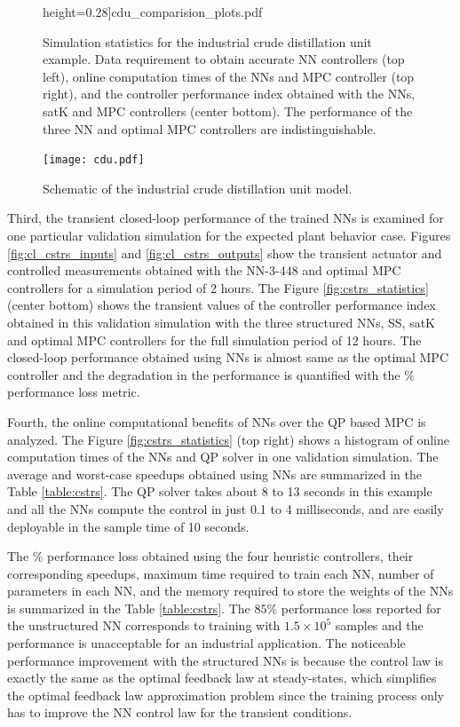 \documentclass[preprint,5p, twocolumn, authoryear]{elsarticle}
\begin{document}
\begin{figure}[!h]
\begin{center}
        height=0.28\textheight]{cdu_comparision_plots.pdf}\end{center}
    \vspace{-0.2in}
    \caption{Simulation statistics for the industrial crude distillation unit
    example. Data requirement to obtain accurate NN controllers (top left),
    online computation times of the NNs and MPC controller (top right), and the
    controller performance index obtained with the NNs, satK and MPC controllers
    (center bottom). The performance of the three NN and optimal MPC
    controllers are indistinguishable.}	
    \label{fig:cdu_statistics}
\end{figure}

\begin{figure}[!h]
    \centering
    \texttt{[image: cdu.pdf]}
    \caption{Schematic of the industrial crude distillation unit model.}
    \label{fig:schematic_cdu}
\end{figure}

Third, the transient closed-loop performance of the trained NNs is examined for
one particular validation simulation for the expected plant behavior case.
Figures \ref{fig:cl_cstrs_inputs} and \ref{fig:cl_cstrs_outputs} show the
transient actuator and controlled measurements obtained with the NN-3-448 and
optimal MPC controllers for a simulation period of 2 hours. The Figure
\ref{fig:cstrs_statistics} (center bottom) shows the transient values of the
controller performance index obtained in this validation simulation with the
three structured NNs, SS, satK and optimal MPC controllers for the full
simulation period of 12 hours. The closed-loop performance obtained using NNs is
almost same as the optimal MPC controller and the degradation in the performance
is quantified with the $\%$ performance loss metric.

Fourth, the online computational benefits of NNs over the QP based MPC is
analyzed. The Figure \ref{fig:cstrs_statistics} (top right) shows a histogram of
online computation times of the NNs and QP solver in one validation simulation.
The average and worst-case speedups obtained using NNs are summarized in the
Table \ref{table:cstrs}. The QP solver takes about 8 to 13 seconds in this
example and all the NNs compute the control in just 0.1 to 4 milliseconds, and
are easily deployable in the sample time of 10 seconds.

The $\%$ performance loss obtained using the four heuristic controllers, their
corresponding speedups, maximum time required to train each NN, number of
parameters in each NN, and the memory required to store  
the weights of the NNs is summarized in the Table \ref{table:cstrs}. The $85 \%$
performance loss reported for the unstructured NN corresponds to training with
$1.5 \times 10^5$ samples and the performance is unacceptable for an industrial
application. The noticeable performance improvement with the structured NNs is
because the control law is exactly the same as the optimal feedback law at
steady-states, which simplifies the optimal feedback law approximation
problem since the training process only has to improve the NN control law for
the transient conditions. 
\end{document}
